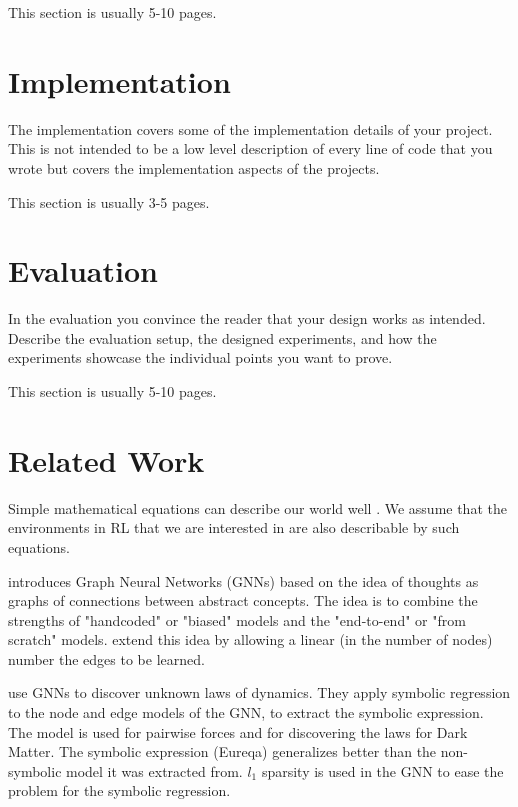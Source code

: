 \documentclass[a4paper,11pt,oneside]{report}
\begin{document}
This section is usually 5-10 pages.


\chapter{Implementation}
\label{ch:implementation}

The implementation covers some of the implementation details of your project.
This is not intended to be a low level description of every line of code that
you wrote but covers the implementation aspects of the projects.

This section is usually 3-5 pages.


\chapter{Evaluation}
\label{ch:evaluation}

In the evaluation you convince the reader that your design works as intended.
Describe the evaluation setup, the designed experiments, and how the
experiments showcase the individual points you want to prove.

This section is usually 5-10 pages.


\chapter{Related Work}
\label{ch:related_work}

Simple mathematical equations can describe our world well \cite{hamming1980unreasonable}. We assume that the environments in RL that we are interested in are also describable by such equations.

\cite{Battaglia2018} introduces Graph Neural Networks (GNNs) based on the idea of thoughts as graphs of connections between abstract concepts. The idea is to combine the strengths of "handcoded" or "biased" models and the "end-to-end" or "from scratch" models. \cite{Velickovic2020} extend this idea by allowing a linear (in the number of nodes) number the edges to be learned.

\cite{Cranmer2020} use GNNs to discover unknown laws of dynamics. They apply symbolic regression to the node and edge models of the GNN, to extract the symbolic expression. The model is used for pairwise forces and for discovering the laws for Dark Matter. The symbolic expression (Eureqa) generalizes better than the non-symbolic model it was extracted from. $l_1$ sparsity is used in the GNN to ease the problem for the symbolic regression.
\end{document}
